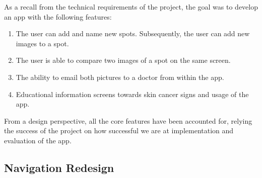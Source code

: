 As a recall from the technical requirements of the project, the goal was to develop an app with the following features:
\begin{enumerate}
        \item The user can add and name new spots. Subsequently, the user can add new images to a spot.
        \item The user is able to compare two images of a spot on the same screen.
        \item The ability to email both pictures to a doctor from within the app.
        \item Educational information screens towards skin cancer signs and usage of the app.
    \end{enumerate}
From a design perspective, all the core features have been accounted for, relying the success of the project on how successful we are at implementation and evaluation of the app.

\subsection{Navigation Redesign}
\label{nav_refactor}

